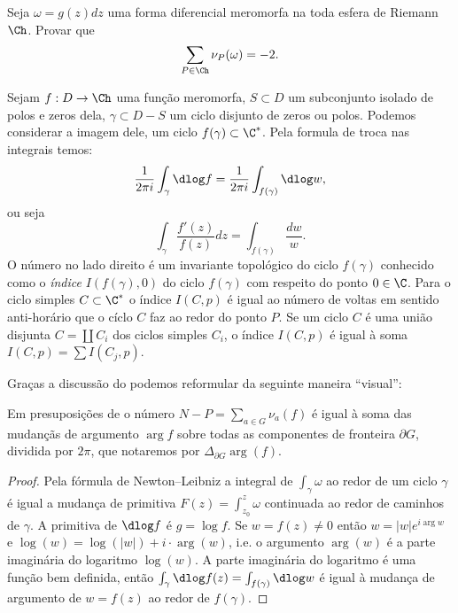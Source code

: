 \begin{problema}
Seja $\omega = g(z) dz$ uma forma diferencial meromorfa na toda esfera de Riemann $\Ch$.
Provar que
\begin{equation}
\label{eq:reciprocidade-valoracoes-formas}
\sum_{P\in\Ch} \nu_P(\omega) = -2.
\end{equation}
\end{problema}

\begin{prop}
\label{p:dlog-indice}
Sejam $f : D \to \Ch$ uma função meromorfa,
$S\subset D$ um subconjunto isolado de polos e zeros dela,
$\gamma \subset D - S$ um ciclo disjunto de zeros ou polos.
Podemos considerar a imagem dele, um ciclo $f(\gamma) \subset \C^*$.
Pela formula de troca nas integrais temos:
\begin{equation}
\frac{1}{2\pi i} \int_\gamma \dlog f = \frac{1}{2\pi i} \int_{f(\gamma)} \dlog w,
\end{equation}
ou seja
\[ \int_\gamma \frac{f'(z)}{f(z)} dz = \int_{f(\gamma)} \frac{dw}{w} .\] 
O número no lado direito é um invariante topológico do ciclo $f(\gamma)$
conhecido como o \emph{índice} $I(f(\gamma),0)$ do ciclo $f(\gamma)$ com respeito do ponto $0\in\C$.
Para o ciclo simples $C\subset\C^*$
o índice $I(C,p)$ é igual ao número de voltas em sentido anti-horário
que o cíclo $C$ faz ao redor do ponto $P$. Se um ciclo $C$ é uma união disjunta $C = \coprod C_i$
dos ciclos simples $C_i$, o índice $I(C,p)$ é igual à soma $I(C,p) = \sum I(C_j,p)$.
\end{prop}

Graças a discussão do 
podemos reformular  da seguinte maneira ``visual'':
\begin{teorema}
\label{t:argumento}
Em presuposições de  o número $N-P = \sum_{a\in G} \nu_a(f)$
é igual à soma das mudançãs de argumento $\arg f$ sobre todas as componentes de fronteira $\partial G$,
dividida por $2\pi$, que notaremos por $\Delta_{\partial G} \arg(f)$.
\end{teorema}
\begin{proof}
Pela fórmula de Newton--Leibniz a integral de $\int_\gamma \omega$ ao redor de um ciclo $\gamma$ é igual
a mudança de primitiva $F(z) = \int_{z_0}^z \omega$ continuada ao redor de caminhos de $\gamma$.
A primitiva de $\dlog f$ é $g=\log f$. Se $w=f(z)\neq0$ então $w = |w| e^{i\arg w}$
e $\log(w) = \log(|w|) + i\cdot \arg(w)$,
i.e. o argumento $\arg(w)$ é a parte imaginária do logaritmo $\log(w)$.
A parte imaginária do logaritmo é uma função bem definida, então
$\int_\gamma \dlog f(z) = \int_{f(\gamma)} \dlog w$
é igual à mudança de argumento de $w=f(z)$ ao redor de $f(\gamma)$.
\end{proof}

